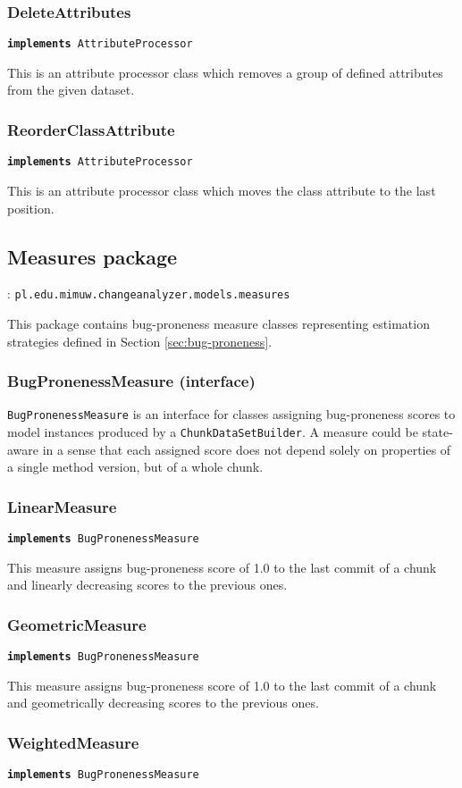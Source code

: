 \documentclass{pracamgr}
\newcommand{\pack}[3]{\subsection{#1 package} \label{sec:#2} \underline{\smash{Full package name}}: \texttt{#3}\medskip}
\newcommand{\implements}[1]{\vspace{-0.5em}\hspace{\parindent}\texttt{\textbf{implements} #1}\vspace{0.5em}}
\begin{document}
\subsubsection*{DeleteAttributes}
\implements{AttributeProcessor}

\noindent This is an attribute processor class which removes a group of defined attributes from the given dataset.

\subsubsection*{ReorderClassAttribute}
\implements{AttributeProcessor}

\noindent This is an attribute processor class which moves the class attribute to the last position.

\pack{Measures}{measures}{pl.edu.mimuw.changeanalyzer.models.measures}

\noindent This package contains bug-proneness measure classes representing estimation strategies defined in Section \ref{sec:bug-proneness}.

\subsubsection*{BugPronenessMeasure (interface)}
\texttt{BugPronenessMeasure} is an interface for classes assigning bug-proneness scores to model instances produced by a \texttt{ChunkDataSetBuilder}. A measure could be state-aware in a sense that each assigned score does not depend solely on properties of a single method version, but of a whole chunk.

\subsubsection*{LinearMeasure}
\implements{BugPronenessMeasure}

\noindent This measure assigns bug-proneness score of 1.0 to the last commit of a chunk and linearly decreasing scores to the previous ones.

\subsubsection*{GeometricMeasure}
\implements{BugPronenessMeasure}

\noindent This measure assigns bug-proneness score of 1.0 to the last commit of a chunk and geometrically decreasing scores to the previous ones.

\subsubsection*{WeightedMeasure}
\implements{BugPronenessMeasure}
\end{document}
